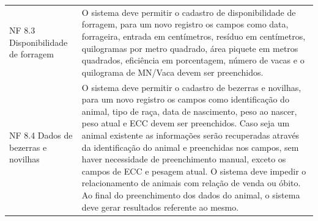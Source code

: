 \begin{tabframed}[htb]
\begin{tabular}{|l|l|}
    \multicolumn{1}{|p{3cm}|}{\raggedright NF 8.3 Disponibilidade de forragem}   &
    \multicolumn{1}{|p{12cm}|}{\raggedright O sistema deve permitir o cadastro de disponibilidade de forragem, para um novo registro os campos como data, forrageira, entrada em centímetros, resíduo em centímetros, quilogramas por metro quadrado, área piquete em metros quadrados, eficiência em porcentagem, número de vacas e o quilograma de MN/Vaca devem ser preenchidos.}
    \\ \cline{1-2}

    \multicolumn{1}{|p{3cm}|}{\raggedright NF 8.4  Dados de bezerras e novilhas} &
    \multicolumn{1}{|p{12cm}|}{\raggedright O sistema deve permitir o cadastro de bezerras e novilhas, para um novo registro os campos como identificação do animal, tipo de raça, data de nascimento, peso ao nascer, peso atual e \gls{ECC} devem ser preenchidos. Caso seja um animal existente as informações serão recuperadas através da identificação do animal e preenchidas nos campos, sem haver necessidade de preenchimento manual, exceto os campos de \gls{ECC} e pesagem atual. O sistema deve impedir o relacionamento de animais com relação de venda ou óbito. Ao final do preenchimento dos dados do animal, o sistema deve gerar resultados referente ao mesmo.}
    \\ \cline{1-2}
  \end{tabular}
  \fonte{}
\end{tabframed}

